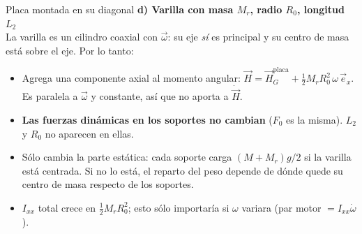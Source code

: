 \begin{solucion}{Placa montada en su diagonal}
\textbf{d) Varilla con masa $M_r$, radio $R_0$, longitud $L_2$}\\
La varilla es un cilindro coaxial con $\vec{\omega}$: su eje \emph{sí} es principal y su centro de masa está sobre el eje. Por lo tanto:
\begin{itemize}[nosep]
  \item Agrega una componente axial al momento angular: $\vec{H} = \vec{H}_G^{\text{placa}} + \tfrac12 M_r R_0^2\,\omega\,\vec{e}_x$. Es paralela a $\vec{\omega}$ y constante, así que no aporta a $\dot{\vec{H}}$.
  \item \textbf{Las fuerzas dinámicas en los soportes no cambian} ($F_0$ es la misma). $L_2$ y $R_0$ no aparecen en ellas.
  \item Sólo cambia la parte estática: cada soporte carga $(M+M_r)g/2$ si la varilla está centrada. Si no lo está, el reparto del peso depende de dónde quede su centro de masa respecto de los soportes.
  \item $I_{xx}$ total crece en $\tfrac12 M_rR_0^2$; esto sólo importaría si $\omega$ variara (par motor $=I_{xx}\dot\omega$).
\end{itemize}

\end{solucion}
